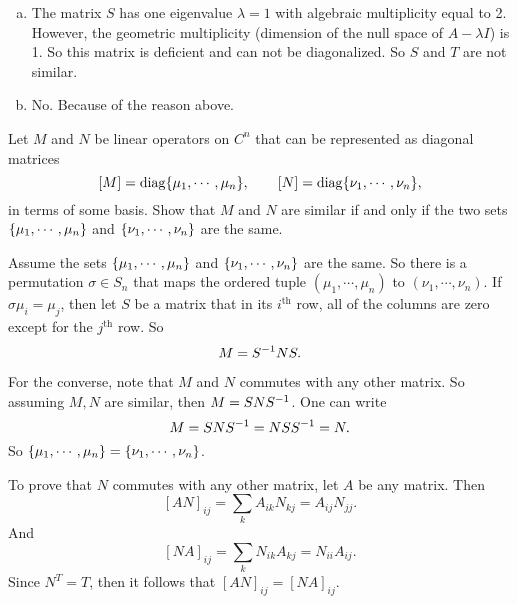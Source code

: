 \begin{solution}
	
	\begin{enumerate}[(a)]
		\item The matrix $ S $ has one eigenvalue $ \lambda = 1 $ with algebraic multiplicity equal to 2. However, the geometric multiplicity (dimension of the null space of $ A-\lambda I $) is 1. So this matrix is deficient and can not be diagonalized. So $ S $ and $ T $ are not similar.
		
		\item No. Because of the reason above.
	\end{enumerate}
	
\end{solution}


\begin{problem}
	Let $ M $ and $ N $ be linear operators on $ C^n $ that can be represented as diagonal matrices
	\[ [M] = \operatorname{diag}\{\mu_1,\cdots,\mu_n\},\qquad [N] = \operatorname{diag}\{\nu_1,\cdots,\nu_n\}, \]
	in terms of some basis. Show that $ M $ and $ N $ are similar if and only if the two sets $ \{\mu_1,\cdots,\mu_n\} $ and $ \{\nu_1,\cdots,\nu_n\} $ are the same.
\end{problem}
\begin{solution}
	Assume  the sets $ \{\mu_1,\cdots,\mu_n\} $ and $ \{\nu_1,\cdots,\nu_n\} $ are the same. So there is a permutation $ \sigma \in S_n $ that maps the ordered tuple $ (\mu_1,\cdots,\mu_n) $ to $ (\nu_1,\cdots,\nu_n) $. If $ \sigma \mu_i = \mu_j $, then let $ S $ be a matrix that in its $ i^\text{th} $ row, all of the columns are zero except for the $ j^\text{th} $ row. So
	\[ M = S^{-1} N S. \]
	
	For the converse, note that $ M $ and $ N $ commutes with any other matrix. So assuming $ M,N $ are similar, then $ M = S N S^{-1} $. One can write
	\[ M = SNS^{-1} = NSS^{-1} = N. \]
	So $ \{\mu_1,\cdots,\mu_n\} = \{\nu_1,\cdots,\nu_n\} $.
\end{solution}
\begin{remark}
	To prove that $ N $ commutes with any other matrix, let $ A $ be any matrix. Then
	\[ [AN]_{ij} = \sum_k A_{ik}N_{kj} = A_{ij}N_{jj}. \]
	And
	\[ [NA]_{ij} = \sum_k N_{ik}A_{kj} = N_{ii}A_{ij}. \]
	Since $ N^T = T $, then it follows that $ [AN]_{ij} = [NA]_{ij} $.
\end{remark}



